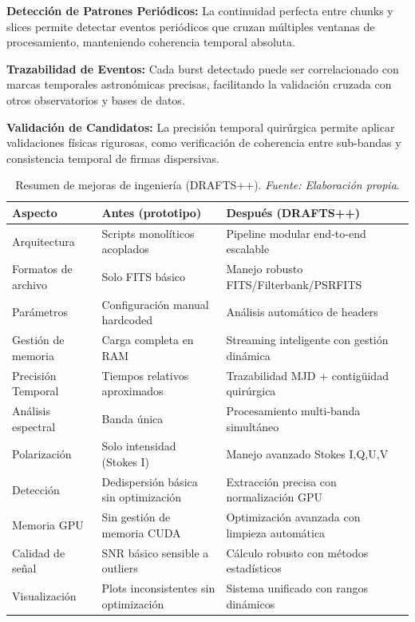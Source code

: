 \textbf{Detección de Patrones Periódicos:} La continuidad perfecta entre chunks y slices permite detectar eventos periódicos que cruzan múltiples ventanas de procesamiento, manteniendo coherencia temporal absoluta.

\textbf{Trazabilidad de Eventos:} Cada burst detectado puede ser correlacionado con marcas temporales astronómicas precisas, facilitando la validación cruzada con otros observatorios y bases de datos.

\textbf{Validación de Candidatos:} La precisión temporal quirúrgica permite aplicar validaciones físicas rigurosas, como verificación de coherencia entre sub-bandas y consistencia temporal de firmas dispersivas.

\begin{table}[H] 
\centering 
  \caption{Resumen de mejoras de ingeniería (DRAFTS++). \textit{Fuente: Elaboración propia}.}
  \label{tab:mejoras}
\begin{tabular}{|l|l|l|} 
\toprule 
    \textbf{Aspecto} & \textbf{Antes (prototipo)} & \textbf{Después (DRAFTS++)} \\
\midrule 
Arquitectura & Scripts monolíticos acoplados & Pipeline modular end-to-end escalable \\ 
    Formatos de archivo & Solo FITS básico & Manejo robusto FITS/Filterbank/PSRFITS \\
    Parámetros & Configuración manual hardcoded & Análisis automático de headers \\
Gestión de memoria & Carga completa en RAM & Streaming inteligente con gestión dinámica \\
Precisión Temporal & Tiempos relativos aproximados & Trazabilidad MJD + contigüidad quirúrgica \\
Análisis espectral & Banda única & Procesamiento multi-banda simultáneo \\
Polarización & Solo intensidad (Stokes I) & Manejo avanzado Stokes I,Q,U,V \\
Detección & Dedispersión básica sin optimización & Extracción precisa con normalización GPU \\
Memoria GPU & Sin gestión de memoria CUDA & Optimización avanzada con limpieza automática \\
Calidad de señal & SNR básico sensible a outliers & Cálculo robusto con métodos estadísticos \\
Visualización & Plots inconsistentes sin optimización & Sistema unificado con rangos dinámicos \\
\bottomrule 
\end{tabular} 
\end{table}

